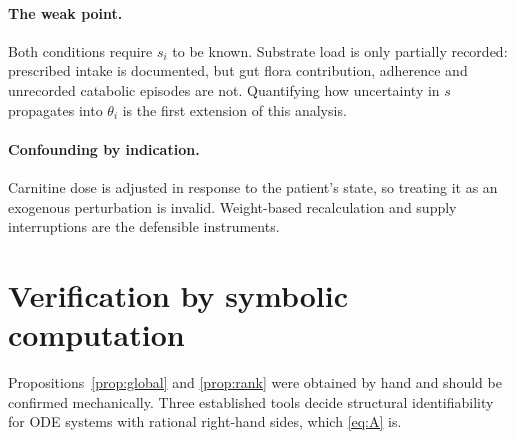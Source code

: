 \documentclass[11pt,a4paper]{article}
\begin{document}
\paragraph{The weak point.} Both conditions require $s_i$ to be known. Substrate load is
only partially recorded: prescribed intake is documented, but gut flora contribution,
adherence and unrecorded catabolic episodes are not. Quantifying how uncertainty in $s$
propagates into $\theta_i$ is the first extension of this analysis.

\paragraph{Confounding by indication.} Carnitine dose is adjusted in response to the
patient's state, so treating it as an exogenous perturbation is invalid. Weight-based
recalculation and supply interruptions are the defensible instruments.

\section{Verification by symbolic computation}

Propositions~\ref{prop:global} and \ref{prop:rank} were obtained by hand and should be
confirmed mechanically. Three established tools decide structural identifiability for ODE
systems with rational right-hand sides, which \eqref{eq:A} is.
\end{document}
